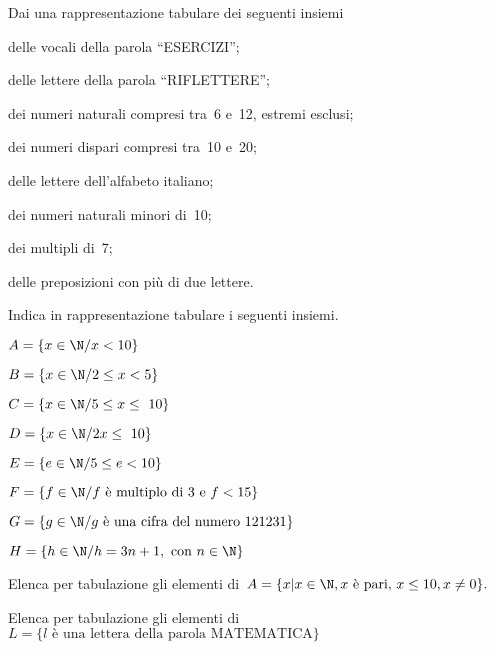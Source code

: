 \begin{esercizio}
\label{ese:6.2}
Dai una rappresentazione tabulare dei seguenti insiemi
\begin{enumeratea}
 \item delle vocali della parola ``ESERCIZI'';
 \item delle lettere della parola ``RIFLETTERE'';
 \item dei numeri naturali compresi tra~6 e~12, estremi esclusi;
 \item dei numeri dispari compresi tra~10 e~20;
 \item delle lettere dell'alfabeto italiano;
 \item dei numeri naturali minori di~10;
 \item dei multipli di~7;
 \item delle preposizioni con più di due lettere.
\end{enumeratea}
\end{esercizio}

\begin{esercizio}
 \label{ese:6.3}
Indica in rappresentazione tabulare i seguenti insiemi.
\TabPositions{7.5cm}
\begin{enumeratea}
 \item \(A=\{x\in\N/x<10\}\)\tab\dotfill
 \item \(B=\{x\in\N/2\le x<5\}\)\tab\dotfill
 \item \(C=\{x\in\N/5\le x\le~10\}\)\tab\dotfill
 \item \(D=\{x\in\N/2x\le~10\}\) \tab\dotfill
 \item \(E=\{e\in\N/5\le e<10\}\)\tab\dotfill
 \item \(F=\{f\in\N/f\text{ è multiplo di~3 e } f<15\}\)\tab\dotfill
 \item \(G=\{g\in\N/g\text{ è una cifra del numero }121231\}\)\tab\dotfill
 \item \(H=\{h\in\N/h=3n+1,\text{ con }n\in\N\}\)\tab\dotfill
\end{enumeratea}
\end{esercizio}

\begin{esercizio}
\label{ese:6.4}
Elenca per tabulazione gli elementi di~\(A=\{x|x\in\N, x\text{ è pari, 
}x\leq10, x\neq0\}.\)
\end{esercizio}

\begin{esercizio}
\label{ese:6.5}
Elenca per tabulazione gli elementi di~\(L=\{l\text{ è una lettera della 
parola 
MATEMATICA}\}\)
\end{esercizio}

